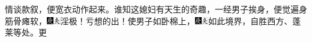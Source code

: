 {情谈款叙，便宽衣动作起来。谁知这媳妇有天生的奇趣，一经男子挨身，便觉遍身筋骨瘫软，{\includegraphics[width=3mm]{../Images/00004}\includegraphics[width=3mm]{../Images/00012}\footnotesize \kaishu 淫极！亏想的出！}使男子如卧棉上，{\includegraphics[width=3mm]{../Images/00004}\includegraphics[width=3mm]{../Images/00012}\footnotesize \kaishu 如此境界，自胜西方、蓬莱等处。}更}
